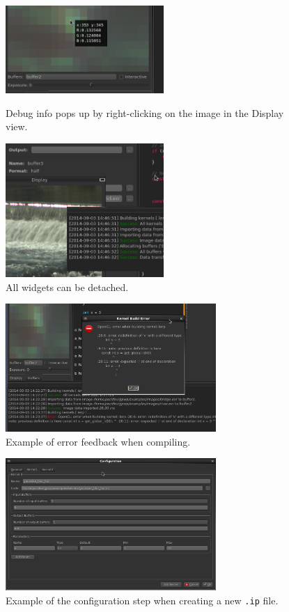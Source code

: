 \begin{center}
\begin{figure}[!tbp]
  \centering
  \begin{minipage}[b]{0.4\textwidth}
    \includegraphics[width=60mm]{img/preview.png}
    \caption{Debug info pops up by right-clicking on the image in the Display view.}
  \end{minipage}
  \hfill
  \begin{minipage}[b]{0.4\textwidth}
    \includegraphics[width=60mm]{img/detach.png}
    \caption{All widgets can be detached.}
  \end{minipage}
\end{figure}
\end{center}

\begin{figure}[ht!]
\centering
\includegraphics[width=80mm]{img/error.png}
\caption{Example of error feedback when compiling.}
\label{gpuippreview}
\end{figure}

\begin{figure}[ht!]
\centering
\includegraphics[width=80mm]{img/config.png}
\caption{Example of the configuration step when creating a new {\tt .ip} file.}
\label{gpuipconfig}
\end{figure}


